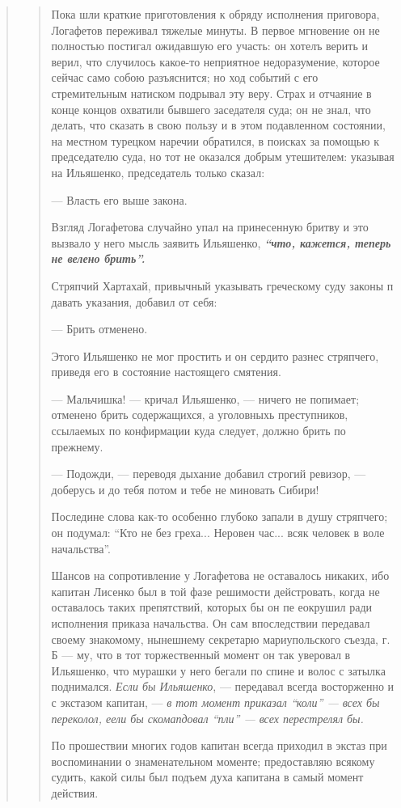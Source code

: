 \begin{quote}
\begin{quote}
Пока шли краткие приготовления к обряду исполнения приговора, Логафетов
переживал тяжелые минуты. В первое мгновение он не полностью постигал ожидавшую
его участь: он хотелъ верить и верил, что случилось какое-то неприятное
недоразумение, которое сейчас само собою разъяснится; но ход событий с его
стремительным натиском подрывал эту веру. Страх и отчаяние в конце концов
охватили бывшего заседателя суда; он не знал, что делать, что сказать в свою
пользу и в этом подавленном состоянии, на местном турецком наречии обратился,
в поисках за помощью к председателю суда, но тот не оказался добрым утешителем:
указывая на Ильяшенко, председатель только сказал:

— Власть его выше закона.

Взгляд Логафетова случайно упал на принесенную
бритву и это вызвало у него мысль заявить Ильяшенко,
\textbf{\emph{``что, кажется, теперь не велено брить''.}}

Стряпчий Хартахай, привычный указывать греческому
суду законы п давать указания, добавил от себя:

— Брить отменено.

Этого Ильяшенко не мог простить и он сердито разнес стряпчего, 
приведя его в состояние настоящего смятения.

— Мальчишка! — кричал Ильяшенко, — ничего не попимает; отменено брить содержащихся, 
а уголовныхь преступников, ссылаемых по конфирмации куда следует,
должно брить по прежнему.

— Подожди, — переводя дыхание добавил строгий ревизор, — доберусь и до тебя потом и тебе не миновать Сибири!

Последине слова как-то особенно глубоко запали в
душу стряпчего; он подумал: ``Кто не без греха... Неровен час... всяк человек 
в воле начальства''.

Шансов на сопротивление у Логафетова не оставалось
никаких, ибо капитан Лисенко был в той фазе решимости дейстровать, 
когда не оставалось таких препятствий,
которых бы он пе еокрушил ради исполнения приказа начальства. Он сам впоследствии передавал 
своему знакомому, нынешнему секретарю мариупольского съезда, г. Б — му,
что в тот торжественный момент он так уверовал в
Ильяшенко, что мурашки у него бегали по спине и волос
с затылка поднимался. \emph{Если бы Ильяшенко}, — передавал
всегда восторженно и с экстазом капитан, — \emph{в тот момент приказал ``коли'' — всех бы переколол, еели бы
скомапдовал ``пли'' — всех перестрелял бы.}

По прошествии многих годов капитан всегда приходил в экстаз при воспоминании 
о знаменательном моменте; предоставляю всякому судить, какой силы был подъем духа 
капитана в самый момент действия.


\end{quote}
\end{quote}
